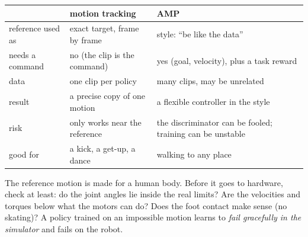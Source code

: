 \begin{keyidea}
\begin{center}
\small
\begin{tabular}{p{2.6cm}p{5cm}p{5cm}}
\hline
 & motion tracking & AMP\\
\hline
reference used as & exact target, frame by frame & style: ``be like the data''\\
needs a command & no (the clip is the command) & yes (goal, velocity), plus a task reward\\
data & one clip per policy & many clips, may be unrelated\\
result & a precise copy of one motion & a flexible controller in the style\\
risk & only works near the reference & the discriminator can be fooled; training can be unstable\\
good for & a kick, a get-up, a dance & walking to any place\\
\hline
\end{tabular}
\end{center}
\end{keyidea}

\begin{aibox}
The reference motion is made for a human body. Before it goes to hardware, check at least: do the joint angles lie inside the real limits? Are the velocities and torques below what the motors can do? Does the foot contact make sense (no skating)? A policy trained on an impossible motion learns to \emph{fail gracefully in the simulator} and fails on the robot.
\end{aibox}

